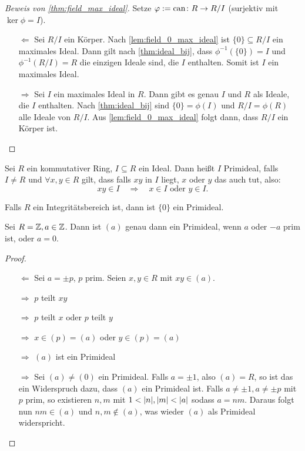 \documentclass[12pt,a4paper]{scrartcl}
\begin{document}
\begin{proof}[Beweis von \cref{thm:field_max_ideal}] %
	Setze $\varphi := \operatorname{can} \colon R\to R/I$ (surjektiv mit $\ker\phi = I$).
	\begin{itemize}
		\item [\glqq $\Leftarrow$\grqq ] Sei $R/I$ ein Körper. Nach \cref{lem:field_0_max_ideal} ist $\{0\}\subseteq R/I$ ein maximales Ideal. Dann gilt nach \cref{thm:ideal_bij}, dass $\phi^{-1}(\{0\}) = I$ und $\phi^{-1}(R/I) = R$ die einzigen Ideale sind, die $I$ enthalten. Somit ist $I$ ein maximales Ideal.
		\item[\glqq$\Rightarrow$\grqq] Sei $I$ ein maximales Ideal in $R$. Dann gibt es genau $I$ und $R$ als Ideale, die $I$ enthalten.
		Nach \cref{thm:ideal_bij} sind $\{0\} = \phi(I)$ und $R/I = \phi(R)$ alle Ideale von $R/I$. Aus \cref{lem:field_0_max_ideal} folgt dann, dass $R/I$ ein Körper ist.
  \qedhere
	\end{itemize}
\end{proof}

\begin{defi}
	Sei $R$ ein kommutativer Ring, $I\subseteq R$ ein Ideal. Dann heißt $I$ Primideal, falls $I\neq R$ und $\forall x, y\in R$ gilt, dass falls $xy$ in $I$ liegt, $x$ oder $y$ das auch tut, also: \[xy\in I \quad \Longrightarrow \quad x\in I\text{ oder }y\in I.\]
\end{defi}
\begin{bem}
	Falls $R$ ein Integritätsbereich ist, dann ist $\{0\}$ ein Primideal.
\end{bem}

\begin{bsp}
	Sei $R = \mathbb Z, a\in \mathbb Z$. Dann ist $(a)$ genau dann ein Primideal, wenn $a$ oder $-a$ prim ist, oder $a = 0$.
\end{bsp}
\begin{proof}
	\leavevmode
	\begin{itemize}
		\item [\glqq $\Leftarrow$\grqq ]Sei $a = \pm p$, $p$ prim. Seien $x,y\in R$ mit $xy\in (a)$.

		$\Rightarrow$ $p$ teilt $xy$

		$\Rightarrow$ $p$ teilt $x$ oder $p$ teilt $y$

		$\Rightarrow$ $x\in (p) = (a)$ oder $y\in (p) = (a)$

		$\Rightarrow$ $(a)$ ist ein Primideal
		\item [\glqq $\Rightarrow$\grqq ] Sei $(a) \neq (0)$ ein Primideal. Falls $a = \pm 1$, also $ (a) = R$, so ist das ein Widerspruch dazu, dass $(a)$ ein Primideal ist. Falls $a \neq \pm 1, a\neq \pm p$ mit $p$ prim, so existieren $n, m$ mit $1<\lvert n\rvert, \lvert m\rvert<\lvert a\rvert$ sodass $a = nm$. 
		Daraus folgt nun $ nm\in (a)$ und $n,m\notin (a)$, was wieder $(a)$ als Primideal widerspricht.
  \qedhere
	\end{itemize}
\end{proof}
\end{document}
